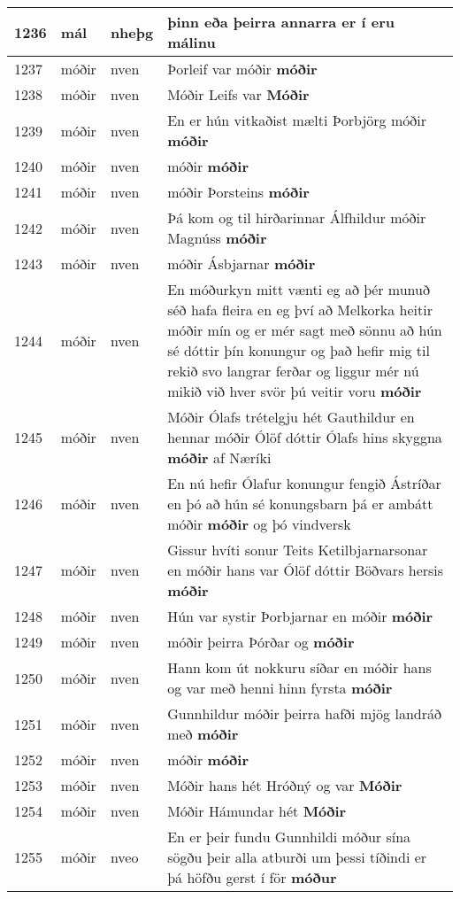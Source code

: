 \documentclass{article}
\begin{document}
\begin{longtable}{p{1cm}|p{1cm}|p{1cm}|p{13cm}}
\hline
1236&mál&nheþg&þinn eða þeirra annarra er í eru \textbf{málinu} \\
\hline
1237&móðir&nven&Þorleif var móðir \textbf{móðir} \\
\hline
1238&móðir&nven&Móðir Leifs var \textbf{Móðir} \\
\hline
1239&móðir&nven&En er hún vitkaðist mælti Þorbjörg móðir \textbf{móðir} \\
\hline
1240&móðir&nven&móðir \textbf{móðir} \\
\hline
1241&móðir&nven&móðir Þorsteins \textbf{móðir} \\
\hline
1242&móðir&nven&Þá kom og til hirðarinnar Álfhildur móðir Magnúss \textbf{móðir} \\
\hline
1243&móðir&nven&móðir Ásbjarnar \textbf{móðir} \\
\hline
1244&móðir&nven&En móðurkyn mitt vænti eg að þér munuð séð hafa fleira en eg því að Melkorka heitir móðir mín og er mér sagt með sönnu að hún sé dóttir þín konungur og það hefir mig til rekið svo langrar ferðar og liggur mér nú mikið við hver svör þú veitir voru \textbf{móðir} \\
\hline
1245&móðir&nven&Móðir Ólafs trételgju hét Gauthildur en hennar móðir Ólöf dóttir Ólafs hins skyggna \textbf{móðir} af Næríki\\
\hline
1246&móðir&nven&En nú hefir Ólafur konungur fengið Ástríðar en þó að hún sé konungsbarn þá er ambátt móðir \textbf{móðir} og þó vindversk\\
\hline
1247&móðir&nven&Gissur hvíti sonur Teits Ketilbjarnarsonar en móðir hans var Ólöf dóttir Böðvars hersis \textbf{móðir} \\
\hline
1248&móðir&nven&Hún var systir Þorbjarnar en móðir \textbf{móðir} \\
\hline
1249&móðir&nven&móðir þeirra Þórðar og \textbf{móðir} \\
\hline
1250&móðir&nven&Hann kom út nokkuru síðar en móðir hans og var með henni hinn fyrsta \textbf{móðir} \\
\hline
1251&móðir&nven&Gunnhildur móðir þeirra hafði mjög landráð með \textbf{móðir} \\
\hline
1252&móðir&nven&móðir \textbf{móðir} \\
\hline
1253&móðir&nven&Móðir hans hét Hróðný og var \textbf{Móðir} \\
\hline
1254&móðir&nven&Móðir Hámundar hét \textbf{Móðir} \\
\hline
1255&móðir&nveo&En er þeir fundu Gunnhildi móður sína sögðu þeir alla atburði um þessi tíðindi er þá höfðu gerst í för \textbf{móður} \\

\end{longtable}
\end{document}
